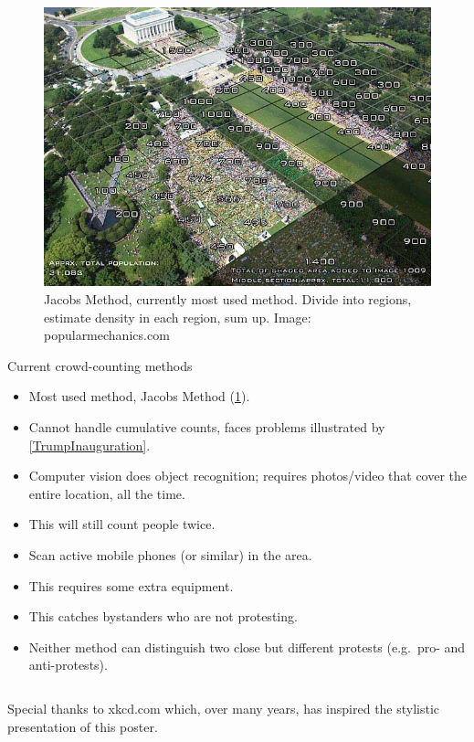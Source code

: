 \begin{columns}[t]
\begin{column}{0.32\linewidth}
    \begin{figure}
      \centering
      \includegraphics[width=\linewidth]{fig/Jacobs-method.jpg}
      \caption{%
        Jacobs Method, currently most used method.
        Divide into regions, estimate density in each region, sum up.
        Image: popularmechanics.com
      }\label{JacobsMethod}
    \end{figure}

    \begin{purpleblock}{Current crowd-counting methods}
      \begin{itemize}
        \item Most used method, Jacobs Method (\cref{JacobsMethod}).
        \item {\color{red} Cannot handle cumulative counts, faces problems 
            illustrated by \cref{TrumpInauguration}.}
        \item Computer vision does object recognition; requires photos/video 
          that cover the entire location, all the time.
        \item {\color{red} This will still count people twice.}
        \item Scan active mobile phones (or similar) in the area.
        \item This requires some extra equipment.
        \item {\color{red} This catches bystanders who are not protesting.}
        \item {\color{red} Neither method can distinguish two close but 
            different protests (e.g.\ pro- and anti-protests).}
      \end{itemize}
    \end{purpleblock}

\end{column}

\end{columns}

\vfill
\flushright{}
Special thanks to xkcd.com which, over many years, has inspired the stylistic 
presentation of this poster.
